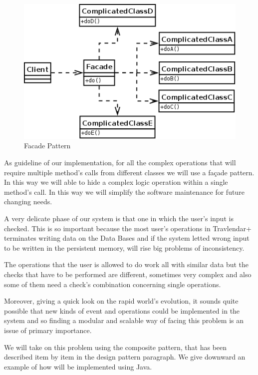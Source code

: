 \begin{figure}[H]
	\centering
	\includegraphics[scale=0.3]{Images/Patterns/Facade_Pattern}
	\caption{Facade Pattern}
\end{figure}
As guideline of our implementation, for all the complex operations that will require multiple method’s calls from different classes we will use a façade pattern. In this way we will able to hide a complex logic operation within a single method’s call. In this way we will simplify the software maintenance for future changing needs.

A very delicate phase of our system is that one in which the user's input is checked. This is so important because the most user’s operations in Travlendar+ terminates writing data on the Data Bases and if the system letted wrong input to be written in the persistent memory, will rise big problems of inconsistency.

The operations that the user is allowed to do work all with similar data but the checks that have to be performed are different, sometimes very complex and also some of them need a check’s combination concerning single operations.

Moreover, giving a quick look on the rapid world’s evolution, it sounds quite possible that new kinds of event and operations could be implemented in the system and so finding a modular and scalable way of facing this problem is an issue of primary importance.

We will take on this problem using the composite pattern, that has been described item by item in the design pattern paragraph. We give downward an example of how will be implemented using Java.

